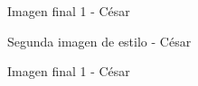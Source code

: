 \documentclass[es]{uc3mreport}
\begin{document}
\begin{report}
    \begin{figure}
        \caption{Imagen final 1 - César}
        \label{final-clm-1}
    \end{figure}

    \begin{figure}
        \caption{Segunda imagen de estilo - César}
        \label{city-2}
    \end{figure}

    \begin{figure}
        \caption{Imagen final 1 - César}
        \label{final-clm-2}
    \end{figure}

    \end{report}



\end{document}
